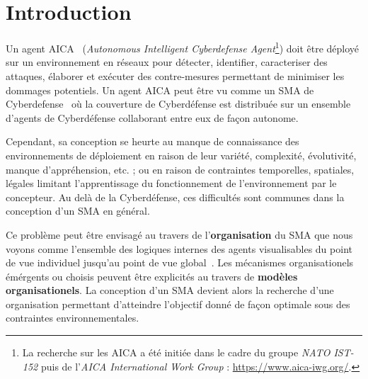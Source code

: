 \documentclass[demonstration]{jfsma}
\begin{document}

\section{Introduction}



Un agent AICA~\cite{Kott2023}
%
(\emph{Autonomous Intelligent Cyberdefense Agent}\footnote{La recherche sur les AICA a été initiée dans le cadre du groupe \emph{NATO IST-152} puis de l'\emph{AICA International Work Group} : \url{https://www.aica-iwg.org/}.})
%
doit être déployé sur un environnement en réseaux pour détecter, identifier, caracteriser des attaques, élaborer et exécuter des contre-mesures permettant de minimiser les dommages potentiels.
Un agent AICA peut être vu comme un SMA de Cyberdefense~\cite{Singh2015} où la couverture de Cyberdéfense est distribuée sur un ensemble d'agents de Cyberdéfense collaborant entre eux de façon autonome.

Cependant, sa conception se heurte au manque de connaissance des environnements de déploiement en raison de leur variété, complexité, évolutivité, manque d'appréhension, etc. ; ou en raison de contraintes temporelles, spatiales, légales limitant l'apprentissage du fonctionnement de l'environnement par le concepteur. Au delà de la Cyberdéfense, ces difficultés sont communes dans la conception d'un SMA en général.

Ce problème peut être envisagé au travers de l'\textbf{organisation} du SMA que nous voyons comme l'ensemble des logiques internes des agents visualisables du point de vue individuel jusqu'au point de vue global~\cite{Picard2009}. Les mécanismes organisationels émérgents ou choisis peuvent être explicités au travers de \textbf{modèles organisationels}.
La conception d'un SMA devient alors la recherche d'une organisation permettant d'atteindre l'objectif donné de façon optimale sous des contraintes environnementales.
\end{document}
